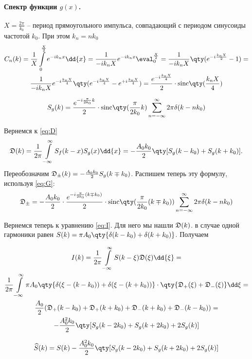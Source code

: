 \documentclass[a4paper,14pt]{extarticle}
\begin{document}
\paragraph{Спектр функции $g(x)$.}%
$X = \frac{2\pi}{k_{0}}$ -- период прямоугольного импульса, совпадающий с
периодом синусоиды частотой 
$k_0$. При этом $k_n = n k_0$
\newcommand{\sinc}[1]{\textrm{sinc}\qty(#1)}
\begin{gather}
    C_n(k) = \frac{1}{X} \int\limits_{0}^{\frac{X}{2}} e^{-i k_n x} \dd{x} = 
    \frac{1}{- i k_n X} e^{-i k_n x} \eval_{0}^{\frac{X}{2}} =
    \frac{1}{- i k_n X} \qty( e^{-i \frac{k_n X}{2}} - 1) = \\
    \frac{1}{- i k_n X} e^{-i \frac{k_n X}{4}}\qty( e^{-i \frac{k_n X}{4}} - e^{+i \frac{k_n X}{4}}) = \frac{e^{-i \frac{k_n X}{4}}}{2} \cdot \sinc{\frac{k_n X}{4}}
\end{gather}

\begin{gather}
    \label{eq:G}
    S_g(k) =\frac{e^{-i  \frac{\pi}{2 k_0}  k} }{2}\cdot
    \sinc{\frac{\pi}{2k_{0}}k}\sum\limits_{n=-\infty}^{\infty}  2 \pi\delta(k - n
    k_0)
\end{gather}

Вернемся к \eqref{eq:D} 
\begin{equation}
    \label{eq:}
    \D(k) = \frac{1}{2 \pi} \int\limits_{-\infty}^{\infty} S_f(k-x) S_g(x) \dd{x} = - \frac{A_{0} k_{0}}{2} \qty[S_g(k-k_{0}) + S_g(k+k_{0})].
\end{equation}
Переобозначим $\mathfrak{D}_{\pm}(k) = - \frac{A_{0} k_{0}}{2} S_g(k \mp k_{0})$.
Распишем теперь эту формулу, используя \eqref{eq:G}:
\begin{equation}
    \label{eq:}
    \D_{\pm} = -\frac{A_{0}k_{0}}{2} \cdot \frac{e^{-i  \frac{\pi}{2 k_0}
    (k\mp k_{0})} }{2}\cdot
    \sinc{\frac{\pi}{2k_{0}}(k\mp k_{0})}\sum\limits_{n=-\infty}^{\infty} 2\pi  \delta(k - n
    k_0)
\end{equation}

Вернемся теперь к уравнению \eqref{eq:I}. 
Для него мы нашли $\mathfrak{D}(k)$.
в случае одной гармоники равен  $S(k) = \pi A_0 \qty{\delta(k-k_{0}) +
\delta(k+k_{0})}$.
Получаем


\begin{gather}
    I(k) = \frac{1}{2\pi} \int\limits_{-\infty}^{\infty}  S(k-\xi)
    \D(\xi)\dd{\xi} = \\
    \frac{1}{2\pi} \int\limits_{-\infty}^{\infty} \pi A_{0}\qty{
    \delta(\xi- (k-k_{0}) ) + \delta(\xi - (k+k_{0})) } 
    \cdot \qty{\D_{+}(\xi) + \D_{-}(\xi)} \dd \xi = \\
    \frac{A_{0}}{2} (
    \D_{+}(k-k_{0}) +
    \D_{+}(k+k_{0}) +
    \D_{-}(k+k_{0}) +
    \D_{-}(k-k_{0}) 
    ) = \\
    -\frac{A_{0}^2 k_{0}}{2} \qty[
    S_g(k-2k_{0}) +
    S_g(k+2k_{0}) +
    2S_g(k)
    ]
\end{gather}

\begin{equation}
    \label{eq:}
    \widehat S(k) = S(k)  
    -\frac{A_{0}^2 k_{0}}{2} \qty[
    S_g(k-2k_{0}) +
    S_g(k+2k_{0}) +
    2S_g(k)
    ]
\end{equation}
\end{document}
